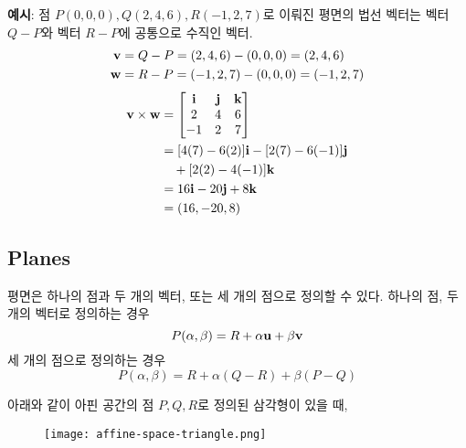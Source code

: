 \begin{framed}
  \noindent \textbf{예시}: 점 $P(0, 0, 0), Q(2, 4, 6), R(-1, 2, 7)$로 이뤄진 평면의 법선 벡터는 벡터 $Q - P$와 벡터 $R - P$에 공통으로 수직인 벡터.
  $$
  \begin{aligned}
    \bold{v} &= Q - P = (2, 4, 6) - (0, 0, 0) = (2, 4, 6) \\
    \bold{w} &= R - P = (-1, 2, 7) - (0, 0, 0) = (-1, 2, 7) \\
  \end{aligned}
  $$
  $$
  \begin{aligned}
    \bold{v} \times \bold{w} &=
    \begin{bmatrix}
      \bold{i} & \bold{j} & \bold{k} \\
      2 & 4 & 6 \\
      -1 & 2 & 7
    \end{bmatrix} \\
    &= [4(7) - 6(2)]\bold{i} - [2(7) - 6(-1)]\bold{j} \\
    &\quad + [2(2) - 4(-1)]\bold{k} \\
    &= 16\bold{i} - 20\bold{j} + 8\bold{k} \\
    &= (16, -20, 8)
  \end{aligned}
  $$
\end{framed}

\subsection{Planes}

평면은 하나의 점과 두 개의 벡터, 또는 세 개의 점으로 정의할 수 있다. 하나의 점, 두 개의 벡터로 정의하는 경우
$$P(\alpha, \beta) = R + \alpha \bold{u} + \beta \bold{v}$$
세 개의 점으로 정의하는 경우
$$P(\alpha, \beta) = R + \alpha (Q - R) + \beta (P - Q)$$

아래와 같이 아핀 공간의 점 $P, Q, R$로 정의된 삼각형이 있을 때,

\begin{figure}[h]
  \centering
  \texttt{[image: affine-space-triangle.png]}
\end{figure}

